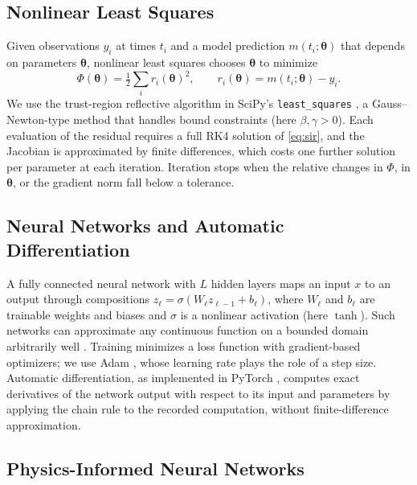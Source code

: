 \documentclass[12pt,a4paper]{article}
\begin{document}
\subsection{Nonlinear Least Squares}

Given observations $y_i$ at times $t_i$ and a model prediction $m(t_i;\boldsymbol\theta)$ that depends on parameters $\boldsymbol\theta$, nonlinear least squares chooses $\boldsymbol\theta$ to minimize
\begin{equation}
  \Phi(\boldsymbol\theta) = \tfrac{1}{2}\sum_i r_i(\boldsymbol\theta)^2, \qquad
  r_i(\boldsymbol\theta) = m(t_i;\boldsymbol\theta) - y_i.
  \label{eq:nls}
\end{equation}
We use the trust-region reflective algorithm in SciPy's \texttt{least\_squares} \citep{virtanen2020}, a Gauss--Newton-type method that handles bound constraints (here $\beta,\gamma>0$). Each evaluation of the residual requires a full RK4 solution of \eqref{eq:sir}, and the Jacobian is approximated by finite differences, which costs one further solution per parameter at each iteration. Iteration stops when the relative changes in $\Phi$, in $\boldsymbol\theta$, or the gradient norm fall below a tolerance.

\subsection{Neural Networks and Automatic Differentiation}

A fully connected neural network with $L$ hidden layers maps an input $x$ to an output through compositions $z_\ell = \sigma(W_\ell z_{\ell-1} + b_\ell)$, where $W_\ell$ and $b_\ell$ are trainable weights and biases and $\sigma$ is a nonlinear activation (here $\tanh$). Such networks can approximate any continuous function on a bounded domain arbitrarily well \citep{hornik1989}. Training minimizes a loss function with gradient-based optimizers; we use Adam \citep{kingma2015}, whose learning rate plays the role of a step size. Automatic differentiation, as implemented in PyTorch \citep{paszke2019}, computes exact derivatives of the network output with respect to its input and parameters by applying the chain rule to the recorded computation, without finite-difference approximation.

\subsection{Physics-Informed Neural Networks}
\end{document}
